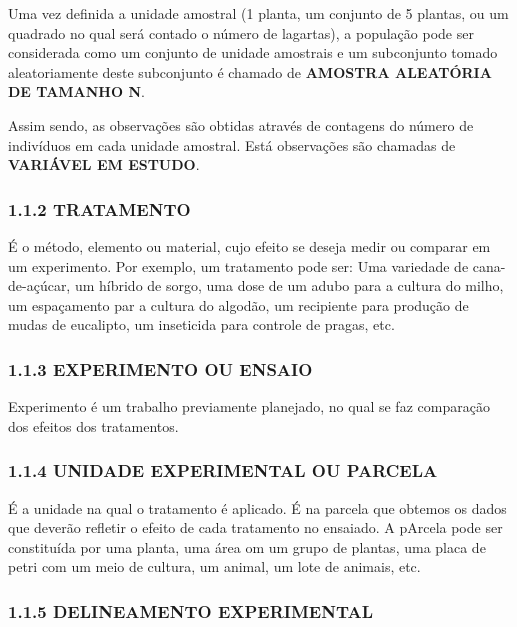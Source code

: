 \documentclass[
]{article}
\begin{document}
Uma vez definida a unidade amostral (1 planta, um conjunto de 5 plantas,
ou um quadrado no qual será contado o número de lagartas), a população
pode ser considerada como um conjunto de unidade amostrais e um
subconjunto tomado aleatoriamente deste subconjunto é chamado de
\textbf{AMOSTRA ALEATÓRIA DE TAMANHO N}.

Assim sendo, as observações são obtidas através de contagens do número
de indivíduos em cada unidade amostral. Está observações são chamadas de
\textbf{VARIÁVEL EM ESTUDO}.

\hypertarget{tratamento}{%
\subsubsection{1.1.2 TRATAMENTO}\label{tratamento}}

É o método, elemento ou material, cujo efeito se deseja medir ou
comparar em um experimento. Por exemplo, um tratamento pode ser: Uma
variedade de cana-de-açúcar, um híbrido de sorgo, uma dose de um adubo
para a cultura do milho, um espaçamento par a cultura do algodão, um
recipiente para produção de mudas de eucalipto, um inseticida para
controle de pragas, etc.

\hypertarget{experimento-ou-ensaio}{%
\subsubsection{1.1.3 EXPERIMENTO OU
ENSAIO}\label{experimento-ou-ensaio}}

Experimento é um trabalho previamente planejado, no qual se faz
comparação dos efeitos dos tratamentos.

\hypertarget{unidade-experimental-ou-parcela}{%
\subsubsection{1.1.4 UNIDADE EXPERIMENTAL OU
PARCELA}\label{unidade-experimental-ou-parcela}}

É a unidade na qual o tratamento é aplicado. É na parcela que obtemos os
dados que deverão refletir o efeito de cada tratamento no ensaiado. A
pArcela pode ser constituída por uma planta, uma área om um grupo de
plantas, uma placa de petri com um meio de cultura, um animal, um lote
de animais, etc.

\hypertarget{delineamento-experimental}{%
\subsubsection{1.1.5 DELINEAMENTO
EXPERIMENTAL}\label{delineamento-experimental}}
\end{document}
